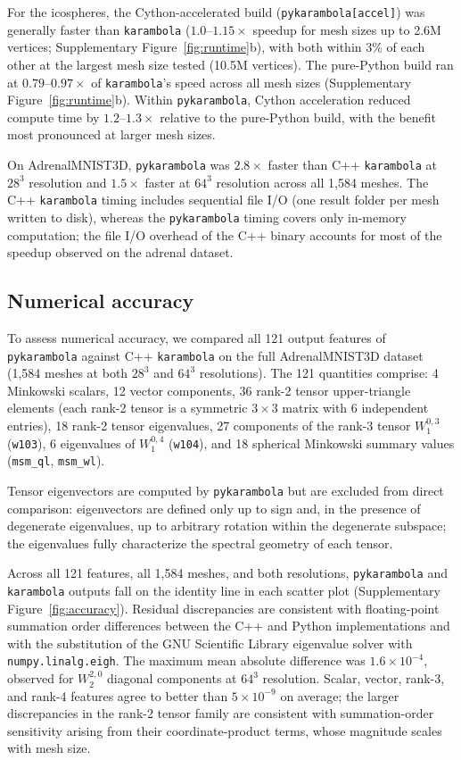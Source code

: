 \documentclass[times, twoside, watermark]{zHenriquesLab-StyleBioRxiv}
\begin{document}
For the icospheres, the Cython-accelerated build (\texttt{pykarambola[accel]}) was
generally faster than \texttt{karambola} ($1.0$--$1.15\times$ speedup for mesh sizes
up to 2.6M vertices; Supplementary Figure~\ref{fig:runtime}b), with both within 3\% of
each other at the largest mesh size tested (10.5M vertices).
The pure-Python build ran at $0.79$--$0.97\times$ of \texttt{karambola}'s speed
across all mesh sizes (Supplementary Figure~\ref{fig:runtime}b).
Within \texttt{pykarambola}, Cython acceleration reduced compute time by
$1.2$--$1.3\times$ relative to the pure-Python build, with the benefit most
pronounced at larger mesh sizes.

On AdrenalMNIST3D, \texttt{pykarambola} was $2.8\times$ faster than C++
\texttt{karambola} at $28^3$ resolution and $1.5\times$ faster at $64^3$
resolution across all 1{,}584 meshes.
The C++ \texttt{karambola} timing includes sequential file I/O (one result folder
per mesh written to disk), whereas the \texttt{pykarambola} timing covers only
in-memory computation; the file I/O overhead of the C++ binary accounts for most
of the speedup observed on the adrenal dataset.

\subsection*{Numerical accuracy}

To assess numerical accuracy, we compared all 121 output features of
\texttt{pykarambola} against C++ \texttt{karambola} on the full AdrenalMNIST3D
dataset~\cite{Yang2023MedMNIST} (1{,}584 meshes at both $28^3$ and $64^3$
resolutions).
The 121 quantities comprise: 4 Minkowski scalars, 12 vector components, 36
rank-2 tensor upper-triangle elements (each rank-2 tensor is a symmetric
$3\times 3$ matrix with 6 independent entries), 18 rank-2 tensor eigenvalues, 27
components of the rank-3 tensor $W_1^{0,3}$ (\texttt{w103}), 6 eigenvalues of
$W_1^{0,4}$ (\texttt{w104}), and 18 spherical Minkowski summary values
(\texttt{msm\_ql}, \texttt{msm\_wl}).

Tensor eigenvectors are computed by \texttt{pykarambola} but are excluded from 
direct comparison: eigenvectors are defined only up to sign and, in the presence 
of degenerate eigenvalues, up to arbitrary rotation within the degenerate 
subspace; the eigenvalues fully characterize the spectral geometry of each tensor.

Across all 121 features, all 1{,}584 meshes, and both resolutions,
\texttt{pykarambola} and \texttt{karambola} outputs fall on the identity line in
each scatter plot (Supplementary Figure~\ref{fig:accuracy}).
Residual discrepancies are consistent with floating-point summation order
differences between the C++ and Python implementations and with the substitution
of the GNU Scientific Library eigenvalue solver with \texttt{numpy.linalg.eigh}.
The maximum mean absolute difference was $1.6 \times 10^{-4}$, observed for
$W_2^{2,0}$ diagonal components at $64^3$ resolution.
Scalar, vector, rank-3, and rank-4 features agree to better than
$5 \times 10^{-9}$ on average; the larger discrepancies in the rank-2 tensor
family are consistent with summation-order sensitivity arising from their
coordinate-product terms, whose magnitude scales with mesh size.
\end{document}
